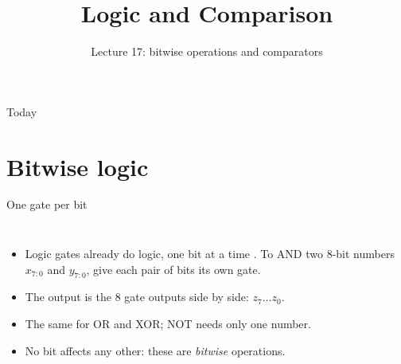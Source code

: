 \documentclass[10pt]{wosm-slides}
\title[Lecture 17 \textperiodcentered\ Logic and Comparison]{Logic and Comparison}
\subtitle{Lecture 17: bitwise operations and comparators}
\begin{document}
\maketitle

\begin{frame}{Today}
  \tableofcontents
\end{frame}

\section{Bitwise logic}

\begin{frame}{One gate per bit}
  \begin{columns}[c, totalwidth=\textwidth]
      \centering
      \par\smallskip
      \begin{itemize}
        \item Logic gates already do logic, one bit at a time . To AND two
          8-bit numbers $x_{7:0}$ and $y_{7:0}$, give each pair of bits its own gate.
        \item The output is the 8 gate outputs side by side: $z_7 \ldots z_0$.
        \item The same for OR and XOR; NOT needs only one number.
        \item No bit affects any other: these are \emph{bitwise} operations.
      \end{itemize}
  \end{columns}
\end{frame}
\end{document}
